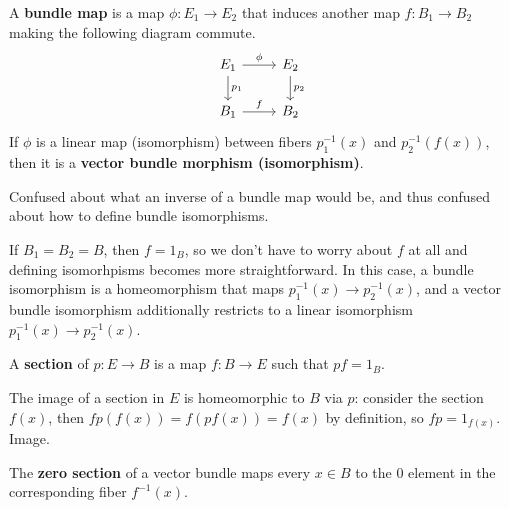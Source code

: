 \documentclass[twoside,10pt]{report}
\begin{document}
\begin{defn}[]
	A \textbf{bundle map} is a map $\phi:E_1\to E_2$ that induces another map $f:B_1\to B_2$ making the following diagram commute.
	\[
	\begin{tikzcd}
		E_1\rar{\phi}\dar{p_1}&E_2\dar{p_2}\\
		B_1\rar{f}&B_2
	\end{tikzcd}
	\]
	If $\phi$ is a linear map (isomorphism) between fibers $p_1^{-1}(x)$ and $p_2^{-1}(f(x))$, then it is a \textbf{vector bundle morphism (isomorphism)}.
\end{defn}
{\color{red}Confused about what an inverse of a bundle map would be, and thus confused about how to define bundle isomorphisms.}

If $B_1=B_2=B$, then $f=1_{B}$, so we don't have to worry about $f$ at all and defining isomorhpisms becomes more straightforward. In this case, a bundle isomorphism is a homeomorphism that maps $p_1^{-1}(x) \to p_2^{-1}(x)$, and a vector bundle isomorphism additionally restricts to a linear isomorphism $p_1^{-1}(x)\to p_2^{-1}(x)$.

\begin{defn}[]
A \textbf{section} of $p:E\to B$ is a map $f:B\to E$ such that $pf=1_{B}$.
\end{defn}
The image of a section in $E$ is homeomorphic to $B$ via $p$: consider the section $f(x)$, then $fp(f(x)) = f(pf(x)) = f(x)$ by definition, so $fp=1_{f(x)}$.
{\color{red}Image.}

\begin{ex}[]
	The \textbf{zero section} of a vector bundle maps every $x \in B$ to the 0 element in the corresponding fiber $f^{-1}(x)$.
\end{ex}
\end{document}

